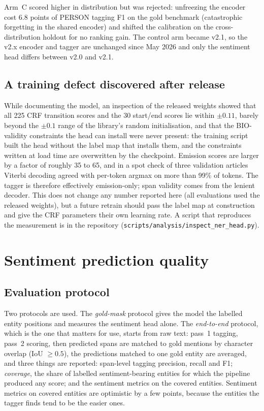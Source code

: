 \documentclass[11pt,letterpaper]{article}
\newcommand{\code}[1]{\texttt{#1}}
\begin{document}
Arm~C scored higher in distribution but was rejected: unfreezing the encoder cost 6.8 points of
PERSON tagging F1 on the gold benchmark (catastrophic forgetting in the shared encoder) and
shifted the calibration on the cross-distribution holdout for no ranking gain. The control arm
became v2.1, so the v2.x encoder and tagger are unchanged since May 2026 and only the sentiment
head differs between v2.0 and v2.1.

\subsection{A training defect discovered after release}
\label{sec:crf}

While documenting the model, an inspection of the released weights showed that all 225 CRF
transition scores and the 30 start/end scores lie within $\pm0.11$, barely beyond the
$\pm0.1$ range of the library's random initialisation, and that the BIO-validity constraints the
head can install were never present: the training script built the head without the label map
that installs them, and the constraints written at load time are overwritten by the checkpoint.
Emission scores are larger by a factor of roughly 35 to 65, and in a spot check of three
validation articles Viterbi decoding agreed with per-token argmax on more than 99\% of tokens.
The tagger is therefore effectively emission-only; span validity comes from the lenient
decoder. This does not change any number reported here (all evaluations used the released
weights), but a future retrain should pass the label map at construction and give the CRF
parameters their own learning rate. A script that reproduces the measurement is in the
repository (\code{scripts/analysis/inspect\_ner\_head.py}).

\section{Sentiment prediction quality}
\label{sec:validation}

\subsection{Evaluation protocol}

Two protocols are used. The \emph{gold-mask} protocol gives the model the labelled entity positions
and measures the sentiment head alone. The \emph{end-to-end} protocol, which is the one that
matters for use, starts from raw text: pass~1 tagging, pass~2 scoring, then predicted spans are
matched to gold mentions by character overlap (IoU $\ge 0.5$), the predictions matched to one gold
entity are averaged, and three things are reported: span-level tagging precision, recall and F1;
\emph{coverage}, the share of labelled sentiment-bearing entities for which the pipeline produced
any score; and the sentiment metrics on the covered entities. Sentiment metrics on covered
entities are optimistic by a few points, because the entities the tagger finds tend to be the
easier ones.
\end{document}

